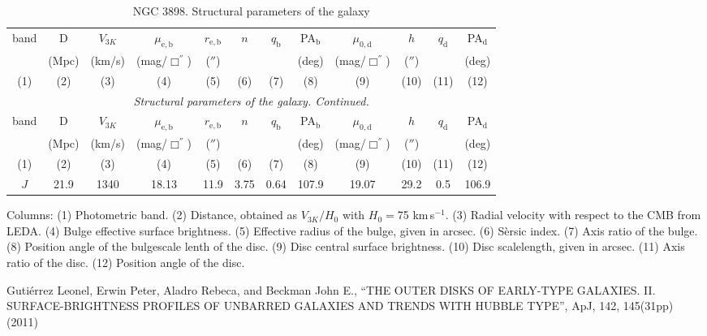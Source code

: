 \documentclass[english,10pt]{article}
\def\mm{\mathrm}
\begin{document}
\begin{longtable}[c]{cccccccccccc}
\caption{NGC 3898. Structural parameters of the galaxy} \\ 
\hline 
band & D & $V_{3K}$ & 
$\mu_\mm{e,b}$ & $r_\mm{e,b}$ & $n$ & $q_\mm{b}$ & PA$_\mm{b}$ & 
$\mu_\mm{0,d}$ & $h$ & $q_\mm{d}$ & PA$_\mm{d}$ \\ 
& (Mpc) & (km/s) & 
(mag/$\Box^{''}$) & ($''$) & & & (deg) & 
(mag/$\Box^{''}$) & ($''$) & & (deg) \\
(1)&(2)&(3)&(4)&(5)&(6)&(7)&(8)&(9)&(10)&(11)&(12) \\ 
\hline
\endfirsthead 
\hline
\multicolumn{12}{c}{\small\slshape Structural parameters of the galaxy. 
Continued. } \\ \hline
band & D & $V_{3K}$ & 
$\mu_\mm{e,b}$ & $r_\mm{e,b}$ & $n$ & $q_\mm{b}$ & PA$_\mm{b}$ & 
$\mu_\mm{0,d}$ & $h$ & $q_\mm{d}$ & PA$_\mm{d}$ \\ 
& (Mpc) & (km/s) & 
(mag/$\Box^{''}$) & ($''$) & & & (deg) & 
(mag/$\Box^{''}$) & ($''$) & & (deg) \\
(1)&(2)&(3)&(4)&(5)&(6)&(7)&(8)&(9)&(10)&(11)&(12) \\
\hline
\endhead 
\hline
$J$ & 21.9 & 1340 &
18.13 & 11.9 & 3.75 & 0.64 & 107.9 & 
19.07 & 29.2 & 0.5 & 106.9 \tabularnewline
\hline
\end{longtable}

Columns:
(1) Photometric band.
(2) Distance, obtained as $V_{3K}/H_0$ with $H_0=$75 km\,s$^{-1}$.
(3) Radial velocity with respect to the CMB from LEDA.
(4) Bulge effective surface brightness. 
(5) Effective radius of the bulge, given in arcsec.
(6) S\`ersic index. 
(7) Axis ratio of the bulge.
(8) Position angle of the bulgescale lenth of the disc.
(9) Disc central surface brightness. 
(10) Disc scalelength, given in arcsec.
(11) Axis ratio of the disc.
(12) Position angle of the disc. 

\newpage
\noindent
Guti\'{e}rrez Leonel, Erwin Peter, Aladro Rebeca, and 
Beckman John E., 
``THE OUTER DISKS OF EARLY-TYPE GALAXIES. 
II. SURFACE-BRIGHTNESS PROFILES OF UNBARRED GALAXIES AND TRENDS 
WITH HUBBLE TYPE'', 
ApJ, 142, 145(31pp) (2011)
\end{document}
